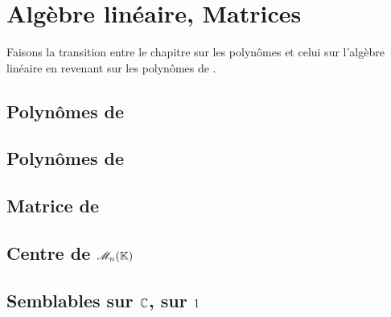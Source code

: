 \setchapterpreamble{\margintoc}
\chapter{Algèbre linéaire, Matrices}



\newpage

%     

Faisons la transition entre le chapitre sur les polynômes et celui sur l'algèbre linéaire en revenant sur les polynômes de .

\section{Polynômes de } \label{polynome_hilbert}


\section{Polynômes de } 


\section{Matrice de } %


\section{Centre de \texorpdfstring{$\mathscr{M}_n(\mathbb{K})$}{l'espace des matrices carrées}}


\section{Semblables sur \texorpdfstring{$\mathbb{C}$, sur $1$}{C, sur R}}


